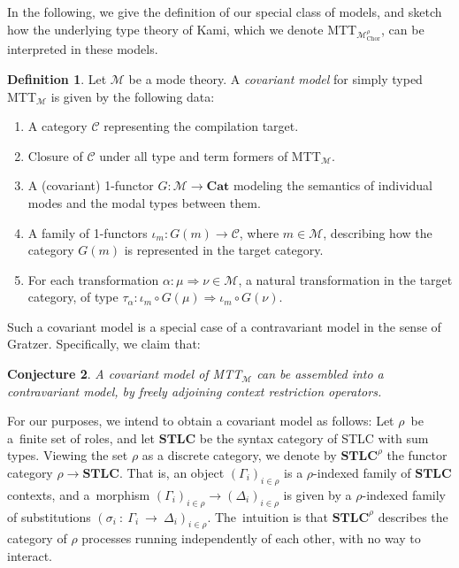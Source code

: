 \documentclass{scrartcl}
\theoremstyle{definition}
\newtheorem{definition}{Definition}
\theoremstyle{plain}
\newtheorem{conjecture}[definition]{Conjecture}
\newcommand{\modetheory}[1]{\mathcal{#1}}
\newcommand{\M}{\modetheory{M}}
\newcommand{\MrhoChor}{\M^\rho_{\textrm{Chor}}}
\newcommand{\MTTM}{MTT${}_{\M}$}
\newcommand{\MTTMrhoChor}{MTT${}_{\MrhoChor}$}
\begin{document}
In the following, we give the definition of our special class of models, and
sketch how the underlying type theory of Kami, which we denote \MTTMrhoChor,
can be interpreted in these models.
\begin{definition}
  Let $\M$ be a mode theory. A \emph{covariant model} for simply typed \MTTM{}
  is given by the following data:
  \begin{enumerate}
  \item
    A category $\mathcal{C}$ representing the compilation target.
  \item
    Closure of $\mathcal{C}$ under all type and term formers of \MTTM{}.
  \item
    A (covariant) 1-functor $G : \M \to \textbf{Cat}$ modeling the semantics of
    individual modes and the modal types between them.
  \item
    A family of 1-functors $\iota_m : G(m) \to \mathcal{C}$, where $m \in \M$,
    describing how the category $G(m)$ is represented in the target category.
  \item
    For each transformation $\alpha : \mu \Rightarrow \nu \in \M$, a natural
    transformation in the target category, of type $\tau_\alpha : \iota_m \circ
    G(\mu) \Rightarrow \iota_m \circ G(\nu)$.
  \end{enumerate}
\end{definition}
Such a covariant model is a special case of a contravariant model in the sense
of Gratzer. Specifically, we claim that:
\begin{conjecture}
  A covariant model of {\upshape \MTTM{}} can be assembled into a contravariant
  model, by freely adjoining context restriction operators.
\end{conjecture}
For our purposes, we intend to obtain a covariant model as follows: Let
$\rho$~be a~finite set of roles, and let $\textbf{STLC}$ be the syntax category
of STLC with sum types. Viewing the set $\rho$ as a discrete category, we
denote by $\textbf{STLC}^\rho$ the functor category $\rho \to \textbf{STLC}$.
That is, an object $(\Gamma_i)_{i\in\rho}$ is a $\rho$-indexed family of
$\textbf{STLC}$ contexts, and a~morphism $(\Gamma_i)_{i\in\rho} \to
(\Delta_i)_{i\in\rho}$ is given by a $\rho$-indexed family of substitutions
$(\sigma_i~:~\Gamma_i~\to~\Delta_i)_{i\in\rho}$. The~intuition is that
$\textbf{STLC}^\rho$ describes the category of $\rho$ processes running
independently of each other, with no way to interact.
\end{document}
